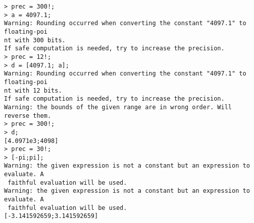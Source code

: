 \begin{center}\begin{minipage}{15cm}\begin{Verbatim}[frame=single]
> prec = 300!;
> a = 4097.1;
Warning: Rounding occurred when converting the constant "4097.1" to floating-poi
nt with 300 bits.
If safe computation is needed, try to increase the precision.
> prec = 12!;
> d = [4097.1; a];
Warning: Rounding occurred when converting the constant "4097.1" to floating-poi
nt with 12 bits.
If safe computation is needed, try to increase the precision.
Warning: the bounds of the given range are in wrong order. Will reverse them.
> prec = 300!;
> d;
[4.0971e3;4098]
> prec = 30!;
> [-pi;pi];
Warning: the given expression is not a constant but an expression to evaluate. A
 faithful evaluation will be used.
Warning: the given expression is not a constant but an expression to evaluate. A
 faithful evaluation will be used.
[-3.141592659;3.141592659]
\end{Verbatim}
\end{minipage}\end{center}
